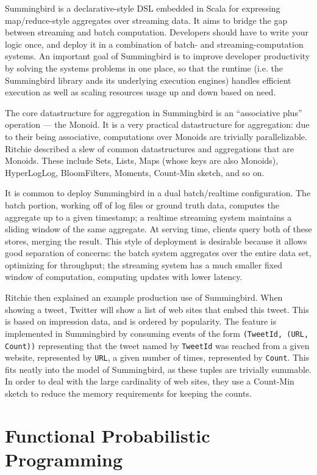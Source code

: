 \documentclass{jfp1}
\begin{document}
Summingbird is a declarative-style DSL embedded in Scala for expressing map/reduce-style
aggregates over streaming data. It aims to bridge the gap between
streaming and batch computation. Developers should have to write your logic
once, and deploy it in a combination of batch- and
streaming-computation systems. An important goal of Summingbird is to
improve developer productivity by solving the systems problems in one
place, so that the runtime (i.e. the Summingbird library ands its
underlying execution engines) handles efficient execution as well as
scaling resources usage up and down based on need.

The core datastructure for aggregation in Summingbird is an
``associative plus'' operation --- the Monoid. It is a very practical
datastructure for aggregation: due to their being associative,
computations over Monoids are trivially parallelizable. Ritchie
described a slew of common datastructures and aggregations that are
Monoids. These include Sets, Lists, Maps (whose keys are also
Monoids), HyperLogLog, BloomFilters, Moments, Count-Min sketch, and so on.

It is common to deploy Summingbird in a dual batch/realtime
configuration. The batch portion, working off of log files or ground
truth data, computes the aggregate up to a given timestamp; a realtime
streaming system maintains a sliding window of the same aggregate. At
serving time, clients query both of these stores, merging the result.
This style of deployment is desirable because it allows good
separation of concerns: the batch system aggregates over the entire
data set, optimizing for throughput; the streaming system has a much
smaller fixed window of computation, computing updates with lower
latency.

Ritchie then explained an example production use of Summingbird. When
showing a tweet, Twitter will show a list of web sites that embed this
tweet. This is based on impression data, and is ordered by popularity.
The feature is implemented in Summingbird by consuming events of
the form \texttt{(TweetId, (URL, Count))} representing that
the tweet named by \texttt{TweetId} was reached from a given website,
represented by \texttt{URL}, a given number of times, represented by 
\texttt{Count}. This fits neatly into the model of Summingbird, as
these tuples are trivially summable. In order to deal with the large
cardinality of web sites, they use a Count-Min sketch to 
reduce the memory requirements for keeping the counts.

\section{Functional Probabilistic Programming}
\end{document}
